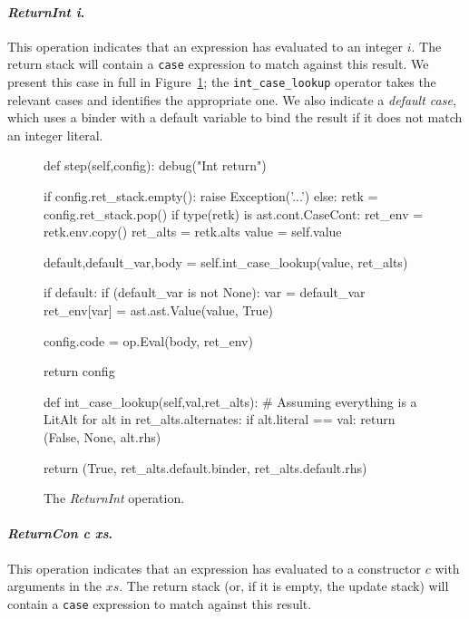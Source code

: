 \documentclass[preprint]{sigplanconf}
\begin{document}
\paragraph{\textit{ReturnInt i}.}
This operation indicates that an expression has evaluated to an integer $i$. The
return stack will contain a \lstinline{case} expression to match against this
result. We present this case in full in Figure~\ref{fig:returnint}; the 
\lstinline{int_case_lookup} operator takes the relevant cases and identifies the
appropriate one. We also indicate a \emph{default case}, which uses a binder
with a default variable to bind the result if it does not match an integer
literal.

\begin{figure}
\begin{code}
def step(self,config):
    debug("Int return")

    if config.ret_stack.empty():
      raise Exception('...')
    else: 
      retk      = config.ret_stack.pop()
      if type(retk) is ast.cont.CaseCont:
        ret_env   = retk.env.copy()
        ret_alts  = retk.alts
        value     = self.value

        default,default_var,body = 
          self.int_case_lookup(value, ret_alts)

        if default:
          if (default_var is not None):
            var = default_var
            ret_env[var] = 
              ast.ast.Value(value, True)

        config.code = op.Eval(body, ret_env)
  
    return config

  def int_case_lookup(self,val,ret_alts):
    # Assuming everything is a LitAlt
    for alt in ret_alts.alternates: 
      if alt.literal == val:
        return (False, None, alt.rhs)

    return (True, 
            ret_alts.default.binder, 
            ret_alts.default.rhs)
\end{code}
\caption{\label{fig:returnint}The \textit{ReturnInt} operation.}
\end{figure}

\paragraph{\textit{ReturnCon c xs}.}
This operation indicates that an expression has evaluated to a constructor $c$
with arguments in the $xs$. The return stack (or, if it is empty, the update
stack) will contain a \lstinline{case} expression to match against this result.
\end{document}
